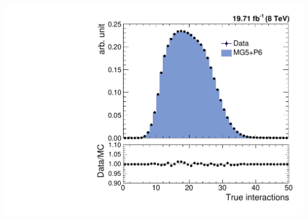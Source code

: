 \documentclass{beamer}
\begin{document}
\begin{frame}
\begin{center}
 ~~\includegraphics[scale=0.3]{Plots_HT_2_150/Nvertices_weight.pdf}
\end{center}
\end{frame}
\end{document}

